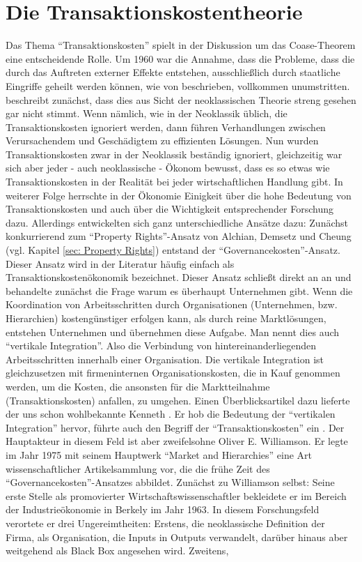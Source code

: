 \section{Die Transaktionskostentheorie}
\label{sec: Transaktionskosten}

Das Thema "`Transaktionskosten"' spielt in der Diskussion um das Coase-Theorem \textcite{Coase1960} eine entscheidende Rolle. Um 1960 war die Annahme, dass die Probleme, dass die durch das Auftreten externer Effekte entstehen, ausschließlich durch staatliche Eingriffe geheilt werden können, wie von \textcite{Pigou1920} beschrieben, vollkommen unumstritten. \textcite{Coase1960} beschreibt zunächst, dass dies aus Sicht der neoklassischen Theorie streng gesehen gar nicht stimmt. Wenn nämlich, wie in der Neoklassik üblich, die Transaktionskosten ignoriert werden, dann führen Verhandlungen zwischen Verursachendem und Geschädigtem zu effizienten Lösungen. Nun wurden Transaktionskosten zwar in der Neoklassik beständig ignoriert, gleichzeitig war sich aber jeder - auch neoklassische - Ökonom bewusst, dass es so etwas wie Transaktionskosten in der Realität bei jeder wirtschaftlichen Handlung gibt. In weiterer Folge herrschte in der Ökonomie Einigkeit über die hohe Bedeutung von Transaktionskosten und auch über die Wichtigkeit entsprechender Forschung dazu. Allerdings entwickelten sich ganz unterschiedliche Ansätze dazu: Zunächst konkurrierend zum "`Property Rights"'-Ansatz von Alchian, Demsetz und Cheung (vgl. Kapitel \ref{sec: Property Rights}) entstand der "`Governancekosten"'-Ansatz. Dieser Ansatz wird in der Literatur häufig einfach als Transaktionskostenökonomik bezeichnet. Dieser Ansatz schließt direkt an \textcite{Coase1960} an und behandelte zunächst die Frage warum es überhaupt Unternehmen gibt. Wenn die Koordination von Arbeitsschritten durch Organisationen (Unternehmen, bzw. Hierarchien) kostengünstiger erfolgen kann, als durch reine Marktlösungen, entstehen Unternehmen und übernehmen diese Aufgabe. Man nennt dies auch "`vertikale Integration"'. Also die Verbindung von hintereinanderliegenden Arbeitsschritten innerhalb einer Organisation. Die vertikale Integration ist gleichzusetzen mit firmeninternen Organisationskosten, die in Kauf genommen werden, um die Kosten, die ansonsten für die Marktteilnahme (Transaktionskosten) anfallen, zu umgehen. Einen Überblicksartikel dazu lieferte der uns schon wohlbekannte Kenneth \textcite{Arrow1969}. Er hob die Bedeutung der "`vertikalen Integration"' hervor, führte auch den Begriff der "`Transaktionskosten"' ein \parencite[S. 39]{Erlei2016}. Der Hauptakteur in diesem Feld ist aber zweifelsohne Oliver E. Williamson. Er legte im Jahr 1975 mit seinem Hauptwerk "`Market and Hierarchies"' \parencite{Williamson1975} eine Art wissenschaftlicher Artikelsammlung \parencite[S. 87]{Voigt2009} vor, die die frühe Zeit des  "`Governancekosten"'-Ansatzes abbildet. Zunächst zu Williamson selbst: Seine erste Stelle als promovierter Wirtschaftswissenschaftler bekleidete er im Bereich der Industrieökonomie in Berkely im Jahr 1963. In diesem Forschungsfeld verortete er drei Ungereimtheiten: Erstens, die neoklassische Definition der Firma, als Organisation, die Inputs in Outputs verwandelt, darüber hinaus aber weitgehend als Black Box angesehen wird. Zweitens, 